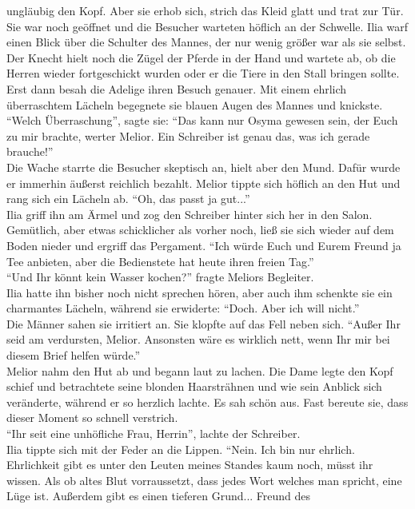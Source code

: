 ungläubig den Kopf. Aber sie erhob sich, strich das Kleid glatt und trat zur Tür. Sie war noch 
geöffnet und die Besucher warteten höflich an der Schwelle. Ilia warf einen Blick über die Schulter 
des Mannes, der nur wenig größer war als sie selbst. Der Knecht hielt noch die Zügel der Pferde in 
der Hand und wartete ab, ob die Herren wieder fortgeschickt wurden oder er die Tiere in den Stall 
bringen sollte. Erst dann besah die Adelige ihren Besuch genauer. Mit einem ehrlich überraschtem 
Lächeln begegnete sie blauen Augen des Mannes und knickste. ``Welch Überraschung'', sagte 
sie: ``Das kann nur Osyma gewesen sein, der Euch zu mir brachte, werter Melior. Ein Schreiber ist 
genau das, was ich gerade brauche!''\\
Die Wache starrte die Besucher skeptisch an, hielt aber den Mund. Dafür wurde er immerhin äußerst 
reichlich bezahlt. Melior tippte sich höflich an den Hut und rang sich ein Lächeln ab. ``Oh, das 
passt ja gut...''\\
Ilia griff ihn am Ärmel und zog den Schreiber hinter sich her in den Salon. Gemütlich, aber etwas 
schicklicher als vorher noch, ließ sie sich wieder auf dem Boden nieder und ergriff das Pergament. 
``Ich würde Euch und Eurem Freund ja Tee anbieten, aber die Bedienstete hat heute ihren freien 
Tag.''\\
``Und Ihr könnt kein Wasser kochen?'' fragte Meliors Begleiter.\\
Ilia hatte ihn bisher noch nicht sprechen hören, aber auch ihm schenkte sie ein charmantes Lächeln, 
während sie erwiderte: ``Doch. Aber ich will nicht.''\\
Die Männer sahen sie irritiert an. Sie klopfte auf das Fell neben sich. ``Außer Ihr seid am 
verdursten, Melior. Ansonsten wäre es wirklich nett, wenn Ihr mir bei diesem Brief helfen würde.''\\
Melior nahm den Hut ab und begann laut zu lachen. Die Dame legte den Kopf schief und betrachtete 
seine blonden Haarsträhnen und wie sein Anblick sich veränderte, während er so herzlich lachte. Es 
sah schön aus. Fast bereute sie, dass dieser Moment so schnell verstrich.\\
``Ihr seit eine unhöfliche Frau, Herrin'', lachte der Schreiber.\\
Ilia tippte sich mit der Feder an die Lippen. ``Nein. Ich bin nur ehrlich. Ehrlichkeit gibt es 
unter den Leuten meines Standes kaum noch, müsst ihr wissen. Als ob altes Blut vorraussetzt, dass 
jedes Wort welches man spricht, eine Lüge ist. Außerdem gibt es einen tieferen Grund... Freund des 
